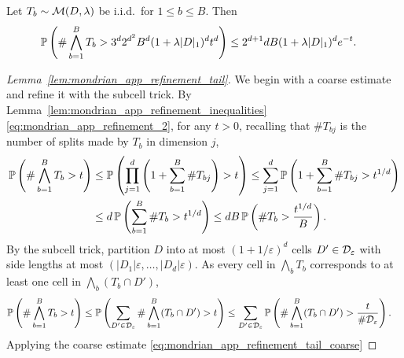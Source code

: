 \begin{lemma}
  \label{lem:mondrian_app_refinement_tail}

  Let $T_b \sim \cM(D, \lambda)$ be i.i.d.\ for $1 \leq b \leq B$. Then
  \begin{align*}
    \P\left(
      \# \bigwedge_{b=1}^B T_b
      > 3^d 2^{d^2} B^d (1+\lambda|D|_1)^d t^d
    \right)
    &\leq
    2^{d+1} d B (1 + \lambda |D|_1)^d e^{-t}.
  \end{align*}

\end{lemma}

\begin{proof}[Lemma~\ref{lem:mondrian_app_refinement_tail}]

  We begin with a coarse estimate and refine it with the subcell trick.
  By Lemma~\ref{lem:mondrian_app_refinement_inequalities}
  \eqref{eq:mondrian_app_refinement_2},
  for any $t > 0$, recalling that $\# T_{b j}$ is the number
  of splits made by $T_b$ in dimension $j$,
  \begin{align}
    \nonumber
    \P\left(
      \# \bigwedge_{b=1}^B T_b
      > t
    \right)
    &\leq
    \P\left(
      \prod_{j=1}^d
      \left(
        1 + \sum_{b=1}^B \# T_{b j}
      \right)
      > t
    \right)
    \leq
    \sum_{j=1}^d
    \P\left(
      1 + \sum_{b=1}^B \# T_{b j}
      > t^{1/d}
    \right) \\
    \label{eq:mondrian_app_refinement_tail_coarse}
    &\leq
    d\, \P\left(
      \sum_{b=1}^B \# T_b
      > t^{1/d}
    \right)
    \leq
    d B\,
    \P\left(
      \# T_b > \frac{t^{1/d}}{B}
    \right).
  \end{align}
  By the subcell trick, partition $D$ into
  at most $(1 + 1/\varepsilon)^d$ cells
  $D' \in \cD_\varepsilon$ with side lengths at most
  $(|D_1| \varepsilon, \ldots, |D_d| \varepsilon)$.
  As every cell in $\bigwedge_b T_b$ corresponds to
  at least one cell in $\bigwedge_b (T_b \cap D')$,
  \begin{align*}
    \P\left(
      \# \bigwedge_{b=1}^B T_b
      > t
    \right)
    &\leq
    \P\left(
      \sum_{D' \in \cD_\varepsilon}
      \# \bigwedge_{b=1}^B (T_b \cap D')
      > t
    \right)
    \leq
    \sum_{D' \in \cD_\varepsilon}
    \P\left(
      \# \bigwedge_{b=1}^B (T_b \cap D')
      > \frac{t}{\# \cD_\varepsilon}
    \right).
  \end{align*}
  Applying the coarse estimate \eqref{eq:mondrian_app_refinement_tail_coarse}

\end{proof}
